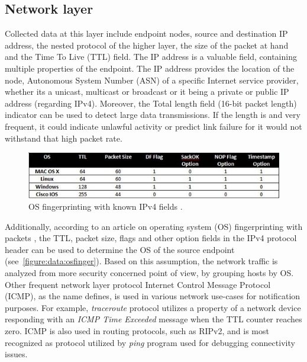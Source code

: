 \documentclass[12pt,a4paper,twoside]{book}
\begin{document}
        \subsection{Network layer} \label{analysis:data:network}
            Collected data at this layer include endpoint nodes, source and destination IP address, the nested protocol of the higher layer, the size of the packet at hand and the Time To Live (TTL) field. The IP address is a valuable field, containing multiple properties of the endpoint. The IP address provides the location of the node, Autonomous System Number (ASN) of a specific Internet service provider, whether its a unicast, multicast or broadcast or it being a private or public IP address (regarding IPv4). Moreover, the Total length field (16-bit packet length) indicator can be used to detect large data transmissions. If the length is and very frequent, it could indicate unlawful activity or predict link failure for it would not withstand that high packet rate.\par
            \begin{figure}[h]
                \centering
                \includegraphics[scale=0.7]{osfingerprinting}
                \caption{OS fingerprinting with known IPv4 fields \cite{web:osfinger}.}
                \label{figure:data:osfinger}
            \end{figure}
            Additionally, according to an article on operating system (OS) fingerprinting with packets \cite{web:osfinger}, the TTL, packet size, flags and other option fields in the IPv4 protocol header can be used to determine the OS of the source endpoint (see~\autoref{figure:data:osfinger}). Based on this assumption, the network traffic is analyzed from more security concerned point of view, by grouping hosts by OS.
            Other frequent network layer protocol Internet Control Message Protocol (ICMP), as the name defines, is used in various network use-cases for notification purposes. For example, \emph{traceroute} protocol utilizes a property of a network device responding with an \emph{ICMP Time Exceeded} message when the TTL counter reaches zero. ICMP is also used in routing protocols, such as RIPv2, and is most recognized as protocol utilized by \emph{ping} program used for debugging connectivity issues.
\end{document}
